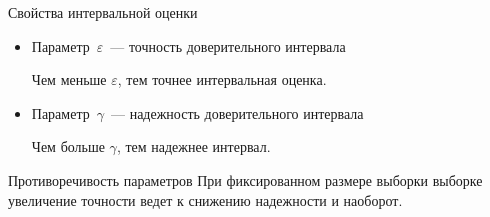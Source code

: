 \documentclass[unicode,11pt,notheorems,xcolor=table]{beamer}
\begin{document}
\begin{frame}{Свойства интервальной оценки}{}
\begin{itemize}
    \item Параметр~$\varepsilon$~--- \alert{точность доверительного интервала}
    
    \smallskip
    \hfill Чем меньше $\varepsilon$, тем точнее интервальная оценка.

    \item Параметр~$\gamma$~--- \alert{надежность доверительного интервала}
    
    \smallskip
    \hfill Чем больше $\gamma$, тем надежнее интервал.
\end{itemize}

\vfill
\begin{alertblock}{Противоречивость параметров}
    При фиксированном размере выборки выборке увеличение точности ведет к снижению надежности и наоборот.
\end{alertblock}

\end{frame}
\end{document}
